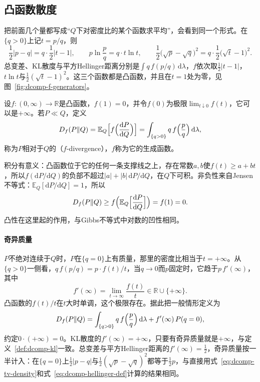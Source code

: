 \subsection{凸函数散度}
\label{sec:dcomp-f-divergence}

把前面几个量都写成“$Q$下对密度比的某个函数求平均”，会看到同一个形式。在$\{q>0\}$上记$t=p/q$，则
\[
 \frac12\lvert p-q\rvert=q\cdot\frac12\lvert t-1\rvert,\qquad p\ln\frac{p}{q}=q\cdot t\ln t,\qquad\frac12\bigl(\sqrt{p}-\sqrt{q}\bigr)^{2}=q\cdot\frac12\bigl(\sqrt{t}-1\bigr)^{2} .
\]
总变差、KL散度与平方Hellinger距离分别是$\int q\,f(p/q)\,\mathrm{d}\lambda$，$f$依次取$\tfrac12\lvert t-1\rvert$，$t\ln t$与$\tfrac12(\sqrt{t}-1)^{2}$。这三个函数都是凸函数，并且在$t=1$处为零，见图~\ref{fig:dcomp-f-generators}。

\begin{definition}[$f$散度]
\label{def:dcomp-f-divergence}
设$f:(0,\infty)\to\mathbb{R}$是凸函数，$f(1)=0$，并令$f(0)$为极限$\lim_{t\downarrow0}f(t)$，它可以是$+\infty$。若$P\ll Q$，定义
\begin{equation}
 D_f(P\Vert Q)=\mathbb{E}_{Q}\Bigl[f\Bigl(\frac{\mathrm{d}P}{\mathrm{d}Q}\Bigr)\Bigr]=\int_{\{q>0\}}q\,f\Bigl(\frac{p}{q}\Bigr)\,\mathrm{d}\lambda ,
 \label{eq:dcomp-f-def}
\end{equation}
称为$P$相对于$Q$的（$f$-divergence），$f$称为它的生成函数。
\end{definition}

积分有意义：凸函数位于它的任何一条支撑线之上，存在常数$a,b$使$f(t)\geq a+bt$，所以$f(\mathrm{d}P/\mathrm{d}Q)$的负部不超过$\lvert a\rvert+\lvert b\rvert\,\mathrm{d}P/\mathrm{d}Q$，在$Q$下可积。非负性来自Jensen不等式：$\mathbb{E}_{Q}[\mathrm{d}P/\mathrm{d}Q]=1$，所以
\[
 D_f(P\Vert Q)\geq f\Bigl(\mathbb{E}_{Q}\Bigl[\frac{\mathrm{d}P}{\mathrm{d}Q}\Bigr]\Bigr)=f(1)=0 .
\]
凸性在这里起的作用，与Gibbs不等式中对数的凹性相同。

\paragraph{奇异质量}
$P$不绝对连续于$Q$时，$P$在$\{q=0\}$上有质量，那里的密度比相当于$t=+\infty$。从$\{q>0\}$一侧看，$q\,f(p/q)=p\cdot f(t)/t$，当$q\to0$而$p$固定时，它趋于$p\,f'(\infty)$，其中
\begin{equation}
 f'(\infty)=\lim_{t\to\infty}\frac{f(t)}{t}\in\mathbb{R}\cup\{+\infty\} .
 \label{eq:dcomp-f-slope-infinity}
\end{equation}
凸函数的$f(t)/t$在$t$大时单调，这个极限存在。据此把一般情形定义为
\begin{equation}
 D_f(P\Vert Q)=\int_{\{q>0\}}q\,f\Bigl(\frac{p}{q}\Bigr)\,\mathrm{d}\lambda+f'(\infty)\,P(q=0),
 \label{eq:dcomp-f-general}
\end{equation}
约定$0\cdot(+\infty)=0$。KL散度的$f'(\infty)=+\infty$，只要有奇异质量就是$+\infty$，与定义~\ref{def:dcomp-kl}一致。总变差与平方Hellinger距离的$f'(\infty)=\tfrac12$，奇异质量按一半计入：在$\{q=0\}$上$\tfrac12\lvert p-q\rvert$与$\tfrac12(\sqrt{p}-\sqrt{q})^{2}$都等于$\tfrac12p$，与直接用式~\eqref{eq:dcomp-tv-density}和式~\eqref{eq:dcomp-hellinger-def}计算的结果相同。

